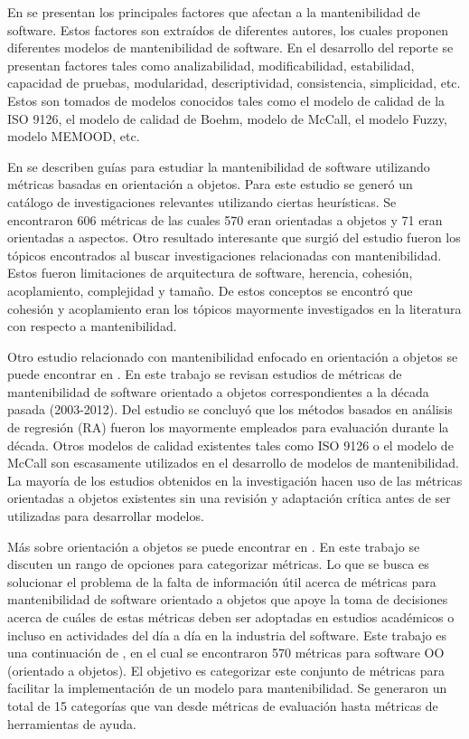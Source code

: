 En \cite{survey} se presentan los principales factores que afectan a la mantenibilidad de
software. Estos factores son extraídos de diferentes autores, los cuales 
proponen diferentes modelos de mantenibilidad de software.
En el desarrollo del reporte se presentan factores tales como 
analizabilidad, modificabilidad, estabilidad, capacidad de pruebas, modularidad,
descriptividad, consistencia, simplicidad, etc. Estos son tomados de modelos
conocidos tales como el modelo de calidad de la ISO 9126, el modelo de calidad
de Boehm, modelo de McCall, el modelo Fuzzy, modelo MEMOOD, etc.

En \cite{roadmap} se describen guías para estudiar la mantenibilidad de software
utilizando métricas basadas en orientación a objetos. Para este estudio
se generó un catálogo de investigaciones relevantes utilizando
ciertas heurísticas. Se encontraron 606 métricas de las cuales 570 eran 
orientadas a objetos y 71 eran orientadas a aspectos. Otro resultado
interesante que surgió del estudio fueron los tópicos encontrados al buscar
investigaciones relacionadas con mantenibilidad. Estos fueron limitaciones
de arquitectura de software, herencia, cohesión, acoplamiento, complejidad
y tamaño. De estos conceptos se encontró que cohesión y acoplamiento eran
los tópicos mayormente investigados en la literatura con respecto a mantenibilidad.

Otro estudio relacionado con mantenibilidad enfocado en orientación a objetos
se puede encontrar en \cite{pastDecade}. En este trabajo se revisan estudios
de métricas de mantenibilidad de software orientado a objetos correspondientes
a la década pasada (2003-2012). Del estudio se concluyó que los métodos
basados en análisis de regresión (RA) fueron los mayormente empleados para
evaluación durante la década. Otros modelos de calidad existentes tales como
ISO 9126 o el modelo de McCall son escasamente utilizados en el desarrollo
de modelos de mantenibilidad. La mayoría de los estudios obtenidos en la investigación
hacen uso de las métricas orientadas a objetos existentes sin una revisión
y adaptación crítica antes de ser utilizadas para desarrollar modelos.

Más sobre orientación a objetos se puede encontrar en \cite{TowardsACatalog}. 
En este trabajo se discuten un rango de opciones para categorizar métricas. 
Lo que se busca es solucionar el problema de la falta de información útil 
acerca de métricas para mantenibilidad de software orientado a objetos que 
apoye la toma de decisiones acerca de cuáles de estas métricas deben ser 
adoptadas en estudios académicos o incluso en actividades del día a día en la 
industria del software. Este trabajo es una continuación de \cite{roadmap}, 
en el cual se encontraron 570 métricas para software OO (orientado a objetos). El objetivo es
categorizar este conjunto de métricas para facilitar la implementación de un 
modelo para mantenibilidad. Se generaron un total de 15 categorías que van 
desde métricas de evaluación hasta métricas de herramientas de ayuda.

